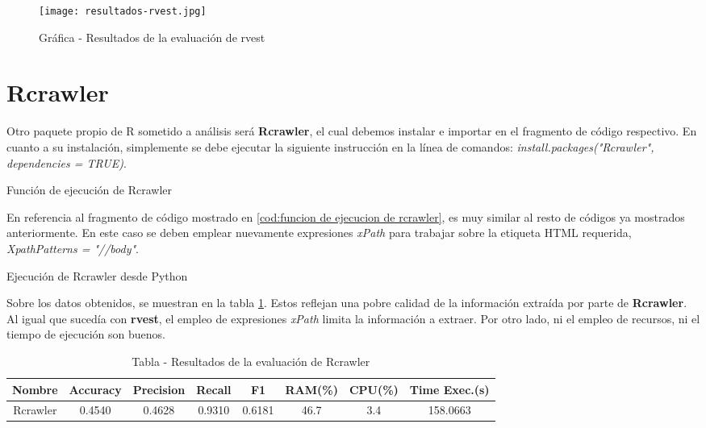 \begin{figure}[tphb]
    \centering
    \texttt{[image: resultados-rvest.jpg]}
    \caption{Gráfica - Resultados de la evaluación de rvest}
    \label{img:grafica - resultados de la evaluacion de rvest}
\end{figure}

\section*{Rcrawler}

Otro paquete propio de R sometido a análisis será \textbf{Rcrawler}, el cual debemos instalar e importar
en el fragmento de código respectivo. En cuanto a su instalación, simplemente se debe ejecutar la siguiente
instrucción en la línea de comandos: \emph{install.packages("Rcrawler", dependencies = TRUE)}.

\begin{codefloat}
    
    \caption{Función de ejecución de Rcrawler}
    \label{cod:funcion de ejecucion de rcrawler}
\end{codefloat}

En referencia al fragmento de código mostrado en \ref{cod:funcion de ejecucion de rcrawler}, es muy similar
al resto de códigos ya mostrados anteriormente. En este caso se deben emplear nuevamente expresiones
\emph{xPath} para trabajar sobre la etiqueta HTML requerida, \emph{XpathPatterns = "//body"}.

\begin{codefloat}
    
    \caption{Ejecución de Rcrawler desde Python}
    \label{cod:ejecucion de rcrawler desde python}
\end{codefloat}

Sobre los datos obtenidos, se muestran en la tabla \ref{tab:tabla - resultados de la evaluacion de rcrawler}.
Estos reflejan una pobre calidad de la información extraída por parte de \textbf{Rcrawler}. Al igual que
sucedía con \textbf{rvest}, el empleo de expresiones \emph{xPath} limita la información a extraer. Por otro 
lado, ni el empleo de recursos, ni el tiempo de ejecución son buenos.

\begin{table}[h]
    \begin{center}
      \begin{tabular}{| c | c | c | c | c | c | c | c |} \hline 
       \textbf{Nombre} & \textbf{Accuracy} & \textbf{Precision}  & \textbf{Recall} & \textbf{F1} & \textbf{RAM(\%)} & \textbf{CPU(\%)} & \textbf{Time Exec.(s)} \\ \hline
       Rcrawler & 0.4540 & 0.4628 & 0.9310 & 0.6181 & 46.7 & 3.4 & 158.0663 \\ \hline
      \end{tabular}
      \caption{Tabla - Resultados de la evaluación de Rcrawler}
      \label{tab:tabla - resultados de la evaluacion de rcrawler}
    \end{center}
\end{table}

